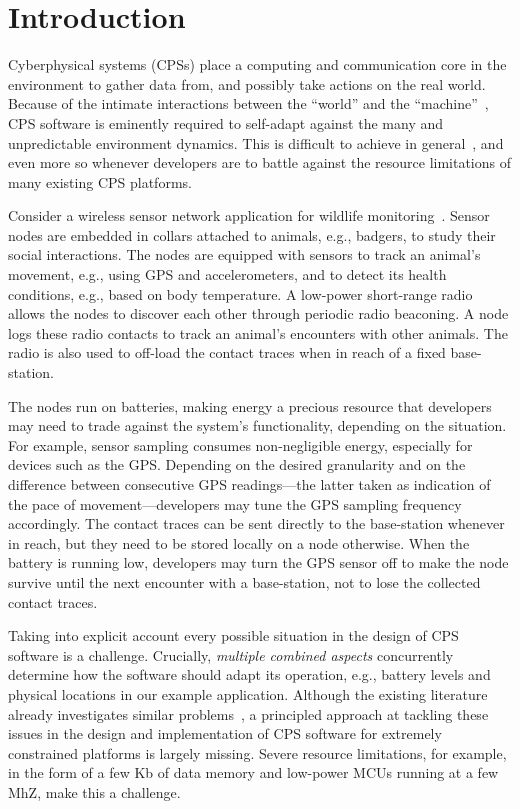 \section{Introduction}

Cyberphysical systems (CPSs) place a computing and communication core
in the environment to gather data from, and possibly take actions on
the real world. Because of the intimate interactions between the
``world'' and the ``machine''~\cite{Jackson:1995:WM:225014.225041},
CPS software is eminently required to self-adapt against the many and
unpredictable environment dynamics. This is difficult to achieve in
general~\cite{cheng:adaptive}, and even more so whenever developers are to
battle against the resource limitations of many existing CPS
platforms.

 Consider a wireless sensor network application for
wildlife monitoring~\cite{pasztor10:selective}.  Sensor nodes are
embedded in collars attached to animals, e.g., badgers, to study their
social interactions. The nodes are equipped with sensors to track an
animal's movement, e.g., using GPS and accelerometers, and to detect
its health conditions, e.g., based on body temperature.  A low-power
short-range radio allows the nodes to discover each other through
periodic radio beaconing.  A node logs these radio contacts to track
an animal's encounters with other animals. The radio is also used to
off-load the contact traces when in reach of a fixed base-station.

The nodes run on batteries, making energy a precious resource that
developers may need to trade against the system's functionality,
depending on the situation. For example, sensor sampling consumes
non-negligible energy, especially for devices such as the
GPS. Depending on the desired granularity and on the difference
between consecutive GPS readings---the latter taken as indication of
the pace of movement---developers may tune the GPS sampling frequency
accordingly. The contact traces can be sent directly to the
base-station whenever in reach, but they need to be stored locally on
a node otherwise.  When the battery is running low, developers may
turn the GPS sensor off to make the node survive until the next
encounter with a base-station, not to lose the collected contact
traces.

 Taking into explicit account every
possible situation in the design of CPS software is a
challenge. Crucially, \emph{multiple combined aspects} concurrently
determine how the software should adapt its operation, e.g., battery
levels and physical locations in our example application. Although the
existing literature already investigates similar
problems~\cite{cheng:adaptive}, a principled approach at tackling
these issues in the design and implementation of CPS software for
extremely constrained platforms is largely missing. Severe resource
limitations, for example, in the form of a few Kb of data memory and low-power
MCUs running at a few MhZ, make this a challenge.

